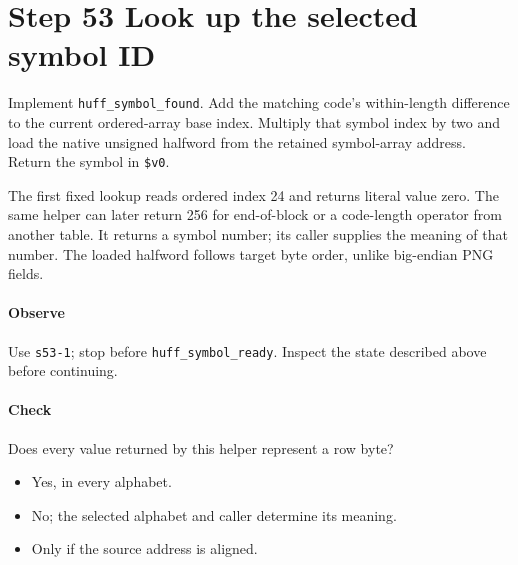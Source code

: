 \section{Step 53 Look up the selected symbol ID}\label{png-huff-s53}
Implement \texttt{huff\_symbol\_found}. Add the matching code's within-length difference to the current ordered-array base index. Multiply that symbol index by two and load the native unsigned halfword from the retained symbol-array address. Return the symbol in \texttt{\$v0}.

The first fixed lookup reads ordered index 24 and returns literal value zero. The same helper can later return 256 for end-of-block or a code-length operator from another table. It returns a symbol number; its caller supplies the meaning of that number. The loaded halfword follows target byte order, unlike big-endian PNG fields.

\paragraph{Observe} Use \texttt{s53-1}; stop before \texttt{huff\_symbol\_ready}. Inspect the state described above before continuing.

\paragraph{Check} Does every value returned by this helper represent a row byte?
\begin{itemize}
  \item[A.] Yes, in every alphabet.
  \item[B.] No; the selected alphabet and caller determine its meaning.
  \item[C.] Only if the source address is aligned.
\end{itemize}
